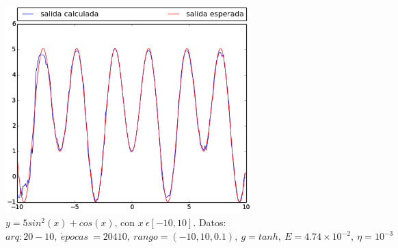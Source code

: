 \documentclass[12pt,a4paper]{article}
\begin{document}
\begin{figure}[H]
\centering
\includegraphics[width=0.85\textwidth]{img/ecuacion3.png}
\caption{\label{fig:ecuacion3} $y = 5sin^{2}(x) + cos(x)\text{, con }  x \ \epsilon [-10,10]$. Datos: $arq: 20-10,\ \acute{e} pocas \ = 20410,\ rango=(-10, 10, 0.1),\ g=tanh, \ E = 4.74 \times 10^{-2},\ \eta = 10^{-3}$}
\end{figure}
\end{document}
